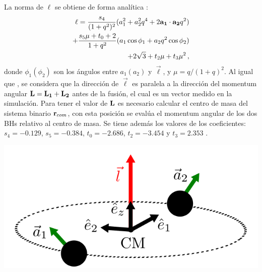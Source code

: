 La norma de $\ell$ se obtiene de forma analítica \cite{rezzolla2008}: 
%
\begin{align}
    \ell = \frac{s_{4}}{(1+q^{2})^{2}}(a_{1}^{2}+a_{2}^{2}q^{4}+2{\bf{a_{1}\cdot a_{2}}}q^{2})\\ + \frac{s_{5}\mu + t_{0}+2}{1+q^{2}}(a_{1}\cos\phi_{1}+a_{2}q^{2}\cos\phi_{2})\\ 
    + 2\sqrt{3}+t_{2}\mu+t_{3}\mu^{2}\,,
\end{align}
donde $\phi_{1}(\phi_{2})$ son los ángulos entre $a_{1}(a_{2})$ y $\vec{\ell}$, y $\mu = q/(1+q)^{2}$. Al igual que \cite{rezzolla2008}, se considera que la dirección de $\Vec{\ell}$ es paralela a la dirección del momentum angular ${\bf{L=L_{1}+L_{2}}}$ antes de la fusión, el cual es un vector medido en la simulación. Para tener el valor de ${\bf{L}}$ es necesario calcular el centro de masa del sistema binario ${\bf{r}}_{com}$, con esta posición se evalúa el momentum angular de los dos BHs relativo al centro de masa. Se tiene además los valores de los coeficientes: $s_{4}=-0.129$, $s_{5}=-0.384$, $t_{0}=-2.686$, $t_{2}=-3.454$ y $t_{3}=2.353$ \cite{rezzolla2008}.

\begin{center}
\includegraphics[scale=.3]{./figures/4_Modelo_Spin/fusion_BHs.png}
\label{fig: fusion_Bhs}
\end{center}















